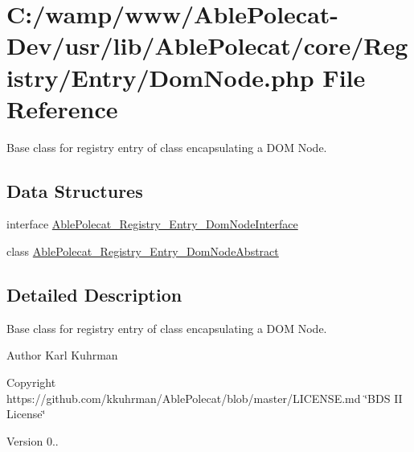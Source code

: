 \hypertarget{_dom_node_8php}{}\section{C\+:/wamp/www/\+Able\+Polecat-\/\+Dev/usr/lib/\+Able\+Polecat/core/\+Registry/\+Entry/\+Dom\+Node.php File Reference}
\label{_dom_node_8php}


Base class for registry entry of class encapsulating a D\+O\+M Node.  


\subsection*{Data Structures}
\begin{DoxyCompactItemize}
\item 
interface \hyperlink{interface_able_polecat___registry___entry___dom_node_interface}{Able\+Polecat\+\_\+\+Registry\+\_\+\+Entry\+\_\+\+Dom\+Node\+Interface}
\item 
class \hyperlink{class_able_polecat___registry___entry___dom_node_abstract}{Able\+Polecat\+\_\+\+Registry\+\_\+\+Entry\+\_\+\+Dom\+Node\+Abstract}
\end{DoxyCompactItemize}


\subsection{Detailed Description}
Base class for registry entry of class encapsulating a D\+O\+M Node. 

\begin{DoxyAuthor}{Author}
Karl Kuhrman 
\end{DoxyAuthor}
\begin{DoxyCopyright}{Copyright}
https\+://github.com/kkuhrman/\+Able\+Polecat/blob/master/\+L\+I\+C\+E\+N\+S\+E.\+md \char`\"{}\+B\+D\+S I\+I License\char`\"{} 
\end{DoxyCopyright}
\begin{DoxyVersion}{Version}
0.. 
\end{DoxyVersion}
